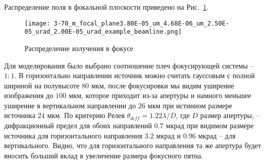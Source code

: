Распределение поля в фокальной плоскости приведено на Рис.~\ref{fig:focusing_system_in_focus}.
\begin{figure}[H] 
	\centering 	\texttt{[image: 3-70\_m\_focal\_plane3.80E-05\_um\_4.68E-06\_um\_2.50E-05\_urad\_2.00E-05\_urad\_example\_beamline.png]}
	\caption{Распределение излучения в фокусе }
	\label{fig:focusing_system_in_focus}
\end{figure}
\noindent Для моделирования было выбрано соотношение плеч фокусирующей системы -- $1:1$. В горизонтально направлении источник можно считать гауссовым с полной шириной на полувысоте $80$ мкм, после фокусировки мы видим уширение изображения до $100$ мкм, которое приходит из-за апертуры и намного меньшее уширение в вертикальном направлении до $26$ мкм при истинном размере источника $24$ мкм. По критерию Релея $\theta_{diff} = 1.22 \lambda / D$, где $D$ размер апертуры, -- дифракционный предел для обоих направлений $0.7$ мкрад при видимом размере источника для горизонтального направления $3.2$ мкрад и $0.96$ мкрад -- для вертикального. Видно, что для горизонтального направления та же апертура будет вносить больший вклад в увеличение размера фокусного пятна.
